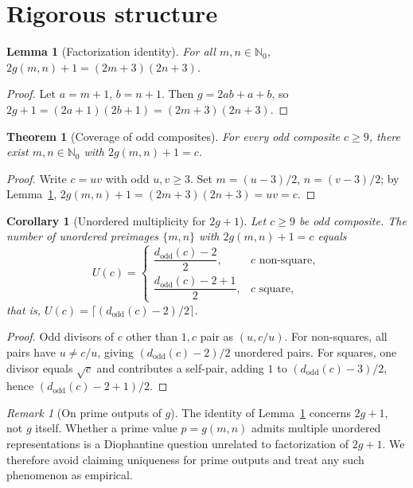\documentclass[12pt]{article}
\theoremstyle{definition}
\theoremstyle{plain}
\newtheorem{lemma}[definition]{Lemma}
\newtheorem{theorem}[definition]{Theorem}
\newtheorem{corollary}[definition]{Corollary}
\theoremstyle{remark}
\newtheorem{remark}[definition]{Remark}
\begin{document}
\section{Rigorous structure}
\begin{lemma}[Factorization identity]\label{lem:fact}
For all \(m,n\in\mathbb{N}_0\), \(2g(m,n)+1=(2m+3)(2n+3)\).
\end{lemma}
\begin{proof}
Let \(a=m+1\), \(b=n+1\). Then \(g=2ab+a+b\), so \(2g+1=(2a+1)(2b+1)=(2m+3)(2n+3)\).
\end{proof}

\begin{theorem}[Coverage of odd composites]\label{thm:coverage}
For every odd composite \(c\ge 9\), there exist \(m,n\in\mathbb{N}_0\) with \(2g(m,n)+1=c\).
\end{theorem}
\begin{proof}
Write \(c=uv\) with odd \(u,v\ge 3\). Set \(m=(u-3)/2\), \(n=(v-3)/2\); by Lemma~\ref{lem:fact}, \(2g(m,n)+1=(2m+3)(2n+3)=uv=c\).
\end{proof}

\begin{corollary}[Unordered multiplicity for \(2g+1\)]\label{cor:mult}
Let \(c\ge 9\) be odd composite. The number of unordered preimages \(\{m,n\}\) with \(2g(m,n)+1=c\) equals
\[
U(c)=\begin{cases}\dfrac{d_{\mathrm{odd}}(c)-2}{2},& c\text{ non-square},\\[6pt]
\dfrac{d_{\mathrm{odd}}(c)-2+1}{2},& c\text{ square},\end{cases}
\]
that is, \(U(c)=\lceil(d_{\mathrm{odd}}(c)-2)/2\rceil\).
\end{corollary}
\begin{proof}
Odd divisors of \(c\) other than \(1,c\) pair as \((u,c/u)\). For non-squares, all pairs have \(u\ne c/u\), giving \((d_{\mathrm{odd}}(c)-2)/2\) unordered pairs. For squares, one divisor equals \(\sqrt{c}\) and contributes a self-pair, adding \(1\) to \((d_{\mathrm{odd}}(c)-3)/2\), hence \((d_{\mathrm{odd}}(c)-2+1)/2\).
\end{proof}

\begin{remark}[On prime outputs of \(g\)]\label{rem:prime}
The identity of Lemma~\ref{lem:fact} concerns \(2g+1\), not \(g\) itself. Whether a prime value \(p=g(m,n)\) admits multiple unordered representations is a Diophantine question unrelated to factorization of \(2g+1\). We therefore avoid claiming uniqueness for prime outputs and treat any such phenomenon as empirical.
\end{remark}
\end{document}
